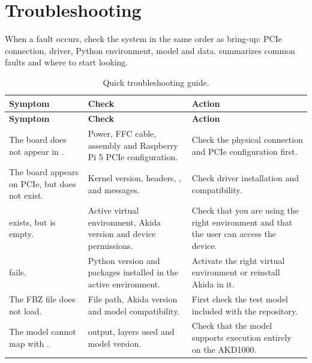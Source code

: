 \chapter{Troubleshooting}
\label{chap:diagnostico}

When a fault occurs, check the system in the same order as bring-up: PCIe connection,
driver, Python environment, model and data.  summarizes
common faults and where to start looking.

\begin{longtable}{@{}L{0.25\textwidth}L{0.34\textwidth}L{0.33\textwidth}@{}}
\caption{Quick troubleshooting guide.}
\label{tab:troubleshooting}\\
\toprule
\textbf{Symptom} & \textbf{Check} & \textbf{Action} \\
\midrule
\endfirsthead

\toprule
\textbf{Symptom} & \textbf{Check} & \textbf{Action} \\
\midrule
\endhead

The board does not appear in . &
Power, FFC cable, assembly and Raspberry Pi 5 PCIe configuration. &
Check the physical connection and PCIe configuration first. \\

The board appears on PCIe, but  does not exist. &
Kernel version, headers, ,  and  messages. &
Check driver installation and compatibility. \\

 exists, but  is empty. &
Active virtual environment, Akida version and device permissions. &
Check that you are using the right environment and that the user can access the device. \\

 fails. &
Python version and packages installed in the active environment. &
Activate the right virtual environment or reinstall Akida in it. \\

The FBZ file does not load. &
File path, Akida version and model compatibility. &
First check the test model included with the repository. \\

The model cannot map with . &
 output, layers used and model version. &
Check that the model supports execution entirely on the AKD1000. \\


\end{longtable}
